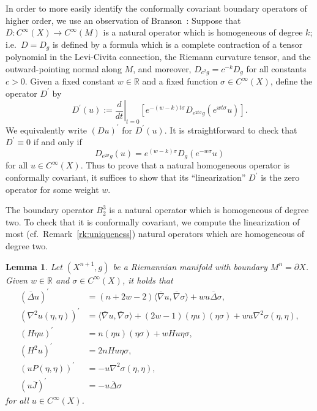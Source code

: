 \documentclass{amsart}
\newtheorem{lem}[thm]{Lemma}
\theoremstyle{definition}
\theoremstyle{remark}
\numberwithin{equation}{section}
\begin{document}
In order to more easily identify the conformally covariant boundary operators of higher order, we use an observation of Branson~\cite{Branson1985}: Suppose that $D\colon C^\infty(X)\to C^\infty(M)$ is a natural operator which is homogeneous of degree $k$; i.e.\ $D=D_g$ is defined by a formula which is a complete contraction of a tensor polynomial in the Levi-Civita connection, the Riemann curvature tensor, and the outward-pointing normal along $M$, and moreover, $D_{c^2g}=c^{-k}D_g$ for all constants $c>0$.  Given a fixed constant $w\in{\mathbb{R}}$ and a fixed function $\sigma\in C^\infty(X)$, define the operator $D^\prime$ by
\[ D^\prime(u) := \left.\frac{d}{dt}\right|_{t=0}\left[ e^{-(w-k)t\sigma}D_{e^{2t\sigma}g}\left(e^{wt\sigma}u\right) \right] . \]
We equivalently write $(Du)^\prime$ for $D^\prime(u)$.  It is straightforward to check that $D^\prime\equiv0$ if and only if
\[ D_{e^{2\sigma}g}(u) = e^{(w-k)\sigma}D_g\left(e^{-w\sigma}u\right) \]
for all $u\in C^\infty(X)$.  Thus to prove that a natural homogeneous operator is conformally covariant, it suffices to show that its ``linearization'' $D^\prime$ is the zero operator for some weight $w$.

The boundary operator $B_2^3$ is a natural operator which is homogeneous of degree two.  To check that it is conformally covariant, we compute the linearization of most (cf.\ Remark~\ref{rk:uniqueness}) natural operators which are homogeneous of degree two.

\begin{lem}
 \label{lem:pre2}
 Let $(X^{n+1},g)$ be a Riemannian manifold with boundary $M^n=\partial X$.  Given $w\in{\mathbb{R}}$ and $\sigma\in C^\infty(X)$, it holds that
 \begin{align*}
  \left({\overline{\Delta}} u\right)^\prime & = (n+2w-2){\langle}{\overline{\nabla}} u,{\overline{\nabla}}\sigma{\rangle} + wu{\overline{\Delta}}\sigma , \\
  \left(\nabla^2u(\eta,\eta)\right)^\prime & = {\langle}{\overline{\nabla}} u,{\overline{\nabla}}\sigma{\rangle} + (2w-1)(\eta u)(\eta\sigma) + wu\nabla^2\sigma(\eta,\eta) , \\
  \left(H\eta u\right)^\prime & = n(\eta u)(\eta\sigma) + wHu\eta\sigma, \\
  \left(H^2u\right)^\prime & = 2nHu\eta\sigma, \\
  \left(uP(\eta,\eta)\right)^\prime & = -u\nabla^2\sigma(\eta,\eta), \\
  \left(u{\overline{J}}\right)^\prime & = -u{\overline{\Delta}}\sigma
 \end{align*}
 for all $u\in C^\infty(X)$.
\end{lem}
\end{document}
